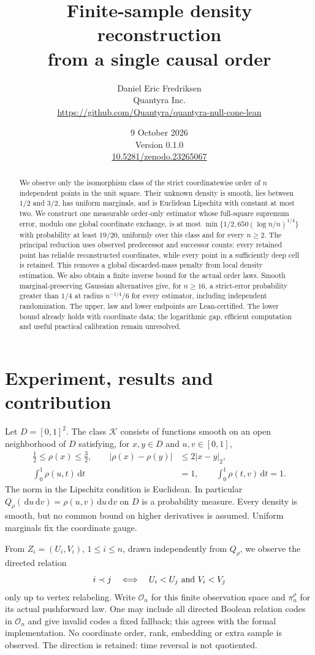 \documentclass[11pt]{article}
\title{Finite-sample density reconstruction\\from a single causal order}
\author{Daniel Eric Fredriksen\\Quantyra Inc.\\
\url{https://github.com/Quantyra/quantyra-null-cone-lean}}
\date{9 October 2026\\Version 0.1.0\\\href{https://doi.org/10.5281/zenodo.23265067}{10.5281/zenodo.23265067}}
\theoremstyle{remark}
\newcommand{\K}{\mathcal K}
\newcommand{\dd}{\,\mathrm d}
\begin{document}
\maketitle
\begin{abstract}
We observe only the isomorphism class of the strict coordinatewise order
of $n$ independent points in the unit square. Their unknown density is
smooth, lies between $1/2$ and $3/2$, has uniform marginals, and is
Euclidean Lipschitz with constant at most two. We construct one measurable
order-only estimator whose full-square supremum error, modulo one global
coordinate exchange, is at most
$\min\{1/2,650(\log n/n)^{1/4}\}$ with probability at least $19/20$,
uniformly over this class and for every $n\ge2$.
The principal reduction uses observed predecessor and successor counts:
every retained point has reliable reconstructed coordinates, while every
point in a sufficiently deep cell is retained. This removes a global
discarded-mass penalty from local density estimation. We also obtain a
finite inverse bound for the actual order laws. Smooth marginal-preserving
Gaussian alternatives give, for $n\ge16$, a strict-error probability
greater than $1/4$ at radius $n^{-1/4}/6$ for every estimator, including
independent randomization. The upper, law and lower endpoints are
Lean-certified. The lower bound already holds with coordinate data;
the logarithmic gap, efficient computation and useful practical
calibration remain unresolved.
\end{abstract}

\section{Experiment, results and contribution}
\label{sec:results}
Let $D=[0,1]^2$. The class $\K$ consists of functions smooth on an open
neighborhood of $D$ satisfying, for $x,y\in D$ and $u,v\in[0,1]$,
\begin{align}
 \tfrac12\le\rho(x)\le\tfrac32,\qquad
 |\rho(x)-\rho(y)|&\le2|x-y|_2, \label{eq:class}\\
 \int_0^1\rho(u,t)\dd t&=1,\qquad
 \int_0^1\rho(t,v)\dd t=1. \nonumber
\end{align}
The norm in the Lipschitz condition is Euclidean. In particular
$Q_\rho(\dd u\dd v)=\rho(u,v)\dd u\dd v$ on $D$ is a probability measure.
Every density is smooth, but no common bound on higher derivatives is
assumed. Uniform marginals fix the coordinate gauge.

From $Z_i=(U_i,V_i)$, $1\le i\le n$, drawn independently from $Q_\rho$,
we observe the directed relation
\[
 i\prec j\quad\Longleftrightarrow\quad U_i<U_j\ \hbox{and}\ V_i<V_j
\]
only up to vertex relabeling. Write $\mathcal O_n$ for this finite
observation space and $\pi_n^\rho$ for its actual pushforward law.
One may include all directed Boolean relation codes in $\mathcal O_n$
and give invalid codes a fixed fallback; this agrees with the formal
implementation. No coordinate order, rank, embedding or extra sample
is observed. The direction is retained: time reversal is not quotiented.
\end{document}
